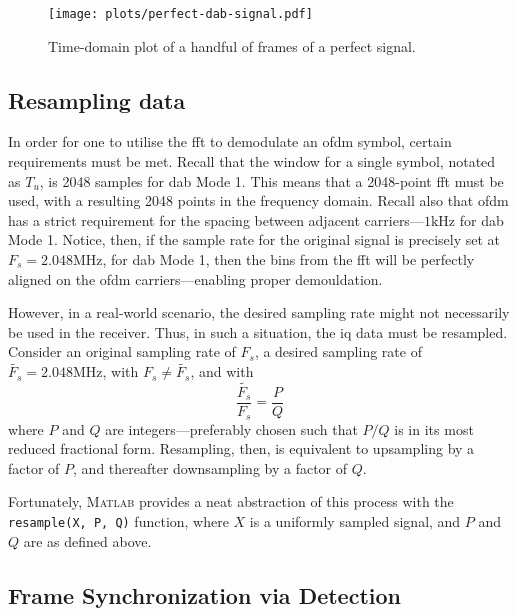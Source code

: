 \documentclass[class=report,11pt,crop=false]{standalone}
\begin{document}
\begin{figure}[htbp]
  \centering
  \captionsetup{type=figure}
  \texttt{[image: plots/perfect-dab-signal.pdf]}
  \caption{Time-domain plot of a handful of frames of a perfect  signal.}
  \label{fig:plots/perfect-dab-signal}
\end{figure}

\subsection{Resampling  data \label{subsect:dab-proc_iq-resample}}
In order for one to utilise the \gls{fft} to demodulate an \gls{ofdm} symbol, certain requirements must be met. Recall that the window for a single symbol, notated as \(T_u\), is 2048 samples for \gls{dab} Mode 1. This means that a 2048-point \gls{fft} must be used, with a resulting 2048 points in the frequency domain. Recall also that \gls{ofdm} has a strict requirement for the spacing between adjacent carriers---\(1 \si{\kilo \hertz}\) for \gls{dab} Mode 1. Notice, then, if the sample rate for the original signal is precisely set at \(F_s = 2.048 \si{\mega \hertz}\), for \gls{dab} Mode 1, then the bins from the \gls{fft} will be perfectly aligned on the \gls{ofdm} carriers---enabling proper demouldation.

However, in a real-world scenario, the desired sampling rate might not necessarily be used in the receiver. Thus, in such a situation, the \gls{iq} data must be resampled. Consider an original sampling rate of \(F_s\), a desired sampling rate of \(\tilde{F_s} = 2.048 \si{\mega \hertz}\), with \(F_s \ne \tilde{F_s}\), and with
\begin{equation}
  \frac{\tilde{F_s}}{F_s} = \frac{P}{Q}
\end{equation}
where \(P\) and \(Q\) are integers---preferably chosen such that \(P/Q\) is in its most reduced fractional form. Resampling, then, is equivalent to upsampling by a factor of \(P\), and thereafter downsampling by a factor of \(Q\).

Fortunately, \textsc{Matlab} provides a neat abstraction of this process with the \texttt{resample(X, P, Q)} function, where \(X\) is a uniformly sampled signal, and \(P\) and \(Q\) are as defined above.

\subsection{Frame Synchronization via  Detection \label{subsect:dab-proc_prs-detect}}
\end{document}
